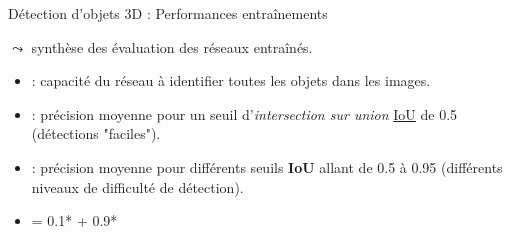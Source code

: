\documentclass[11pt,serif,mathserif,compress,hyperref={colorlinks}]{beamer}
\begin{document}
\begin{frame}{Détection d'objets 3D : Performances entraînements}
 
  \begin{tcolorbox}[title=Indicateurs de précision détection des réseaux détecteur, add to width=.7cm, height=68mm]
    {\small
       $\leadsto$ synthèse des évaluation des réseaux entraînés.
      \begin{itemize}
      \item<2->  : capacité du réseau à identifier toutes les objets dans les images.
      \item<3->  : précision moyenne pour un seuil d'{\em intersection sur union}
        \href{https://medium.com/@prathameshamrutkar3/the-complete-guide-to-object-detection-evaluation-metrics-from-iou-to-map-and-more-1a23c0ea3c9d}{IoU} de 0.5 
        (détections "faciles").\\
      \item<6->  : précision moyenne pour différents seuils \textbf{IoU} allant de 0.5 à 0.95
        (différents niveaux de difficulté de détection).
      \item<7->  = 0.1* + 0.9*

\end{itemize}}
\end{tcolorbox}
\end{frame}
\end{document}
